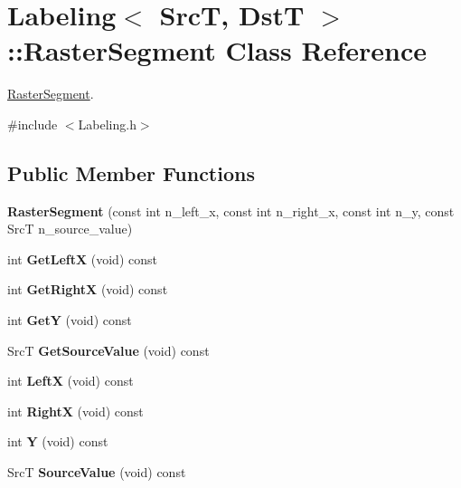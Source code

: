 \hypertarget{class_labeling_1_1_raster_segment}{}\section{Labeling$<$ SrcT, DstT $>$\+:\+:Raster\+Segment Class Reference}
\label{class_labeling_1_1_raster_segment}


\hyperlink{class_labeling_1_1_raster_segment}{Raster\+Segment}.  




{\ttfamily \#include $<$Labeling.\+h$>$}

\subsection*{Public Member Functions}
\begin{DoxyCompactItemize}
\item 
\hypertarget{class_labeling_1_1_raster_segment_a038378c28d61700aba53dc77d166ff1b}{}\label{class_labeling_1_1_raster_segment_a038378c28d61700aba53dc77d166ff1b} 
{\bfseries Raster\+Segment} (const int n\+\_\+left\+\_\+x, const int n\+\_\+right\+\_\+x, const int n\+\_\+y, const SrcT n\+\_\+source\+\_\+value)
\item 
\hypertarget{class_labeling_1_1_raster_segment_a1a15635f3be37d578dd97d58fd6f0693}{}\label{class_labeling_1_1_raster_segment_a1a15635f3be37d578dd97d58fd6f0693} 
int {\bfseries Get\+LeftX} (void) const
\item 
\hypertarget{class_labeling_1_1_raster_segment_a0c71ece8e7bf6976303de878e4b649e6}{}\label{class_labeling_1_1_raster_segment_a0c71ece8e7bf6976303de878e4b649e6} 
int {\bfseries Get\+RightX} (void) const
\item 
\hypertarget{class_labeling_1_1_raster_segment_ab2012942902b1c773af763d03745c81c}{}\label{class_labeling_1_1_raster_segment_ab2012942902b1c773af763d03745c81c} 
int {\bfseries GetY} (void) const
\item 
\hypertarget{class_labeling_1_1_raster_segment_a61ea6bd9568ad291c4ab82f74e7c3df4}{}\label{class_labeling_1_1_raster_segment_a61ea6bd9568ad291c4ab82f74e7c3df4} 
SrcT {\bfseries Get\+Source\+Value} (void) const
\item 
\hypertarget{class_labeling_1_1_raster_segment_af1ab96570b660c4100703977f7b4d3c4}{}\label{class_labeling_1_1_raster_segment_af1ab96570b660c4100703977f7b4d3c4} 
int {\bfseries LeftX} (void) const
\item 
\hypertarget{class_labeling_1_1_raster_segment_a885de7fccb6ab86adb7715eaeeb205d0}{}\label{class_labeling_1_1_raster_segment_a885de7fccb6ab86adb7715eaeeb205d0} 
int {\bfseries RightX} (void) const
\item 
\hypertarget{class_labeling_1_1_raster_segment_a023e28bb05044fc1233ab017e0565897}{}\label{class_labeling_1_1_raster_segment_a023e28bb05044fc1233ab017e0565897} 
int {\bfseries Y} (void) const
\item 
\hypertarget{class_labeling_1_1_raster_segment_aea069bf94270bff59334d4645f37966e}{}\label{class_labeling_1_1_raster_segment_aea069bf94270bff59334d4645f37966e} 
SrcT {\bfseries Source\+Value} (void) const
\end{DoxyCompactItemize}
